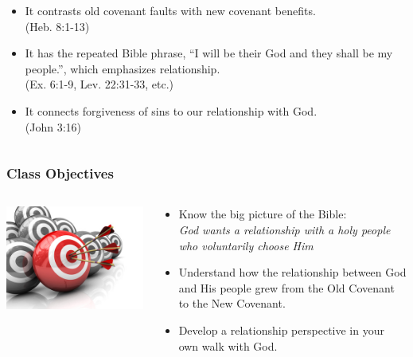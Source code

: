 \begin{frame}
\begin{columns}
\begin{column}{0.6\textwidth}
\begin{itemize}
\item It contrasts old covenant faults with new covenant benefits.\\{\footnotesize (Heb. 8:1-13)}
\item It has the repeated Bible phrase, ``I will be their God and they shall be my people.'', which emphasizes relationship.\\{\footnotesize (Ex. 6:1-9, Lev. 22:31-33, etc.)}
\item It connects forgiveness of sins to our relationship with God.\\ {\footnotesize(John 3:16)}
\end{itemize}
\end{column}
\end{columns}
\end{frame}

\begin{frame}
\frametitle{Class Objectives}
	\begin{columns}
	\begin{column}{0.4\textwidth}
		\includegraphics[width=\columnwidth]{figures/objectives.jpg}
	\end{column}
	\begin{column}{0.6\textwidth}
		\begin{itemize}
		\item Know the big picture of the Bible:\\\emph{God wants a relationship with a holy people who voluntarily choose Him}
		\item Understand how the relationship between God and His people grew from the Old Covenant to the New Covenant.
		\item Develop a relationship perspective in your own walk with God.
		\end{itemize}
	\end{column}
	\end{columns}
\end{frame}

